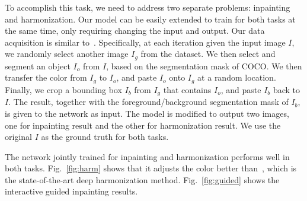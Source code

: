 To accomplish this task, we need to address two separate problems: inpainting and harmonization. Our model can be easily extended to train for both tasks at the same time, only requiring changing the input and output. Our data acquisition is similar to~\cite{tsai2017deep}. Specifically, at each iteration given the input image $I$, we randomly select another image $I_g$ from the dataset. We then select and segment an object $I_o$ from $I$, based on the segmentation mask of COCO. We then transfer the color from $I_g$ to $I_o$, and paste $I_o$ onto $I_g$ at a random location. Finally, we crop a bounding box $I_b$ from $I_g$ that contains $I_o$, and paste $I_b$ back to $I$. The result, together with the foreground/background segmentation mask of $I_b$, is given to the network as input. The model is modified to output two images, one for inpainting result and the other for harmonization result. We use the original $I$ as the ground truth for both tasks.

The network jointly trained for inpainting and harmonization performs well in both tasks. Fig.~\ref{fig:harm} shows that it adjusts the color better than~\cite{tsai2017deep}, which is the state-of-the-art deep harmonization method. Fig.~\ref{fig:guided} shows the interactive guided inpainting results.

